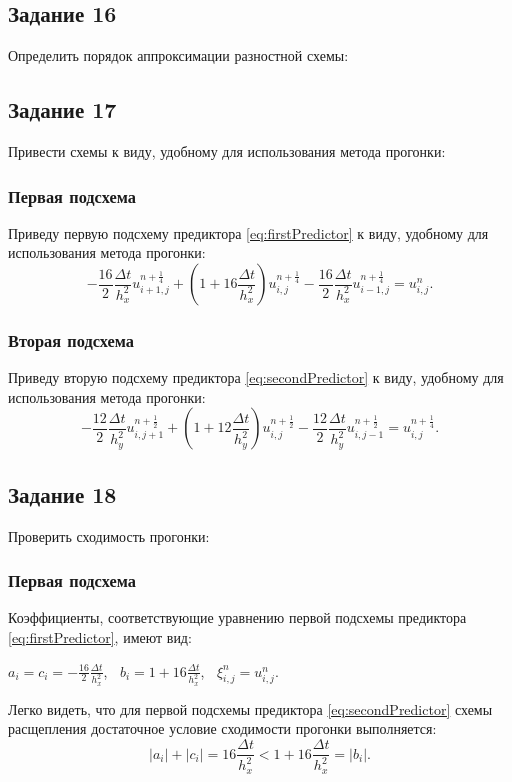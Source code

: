 \documentclass[12pt, a4paper]{report}
\begin{document}
	\subsection*{Задание 16}
	\large
	Определить порядок аппроксимации разностной схемы:

	\subsection*{Задание 17}
	\large
	Привести схемы к виду, удобному для использования метода прогонки:
	\subsubsection*{Первая подсхема}
	\large
	Приведу первую подсхему предиктора \eqref{eq:firstPredictor} к виду, удобному для использования метода прогонки:
	\small
	\begin{equation*}
		-\frac{16}{2}\frac{\Delta t}{h_{x}^{2}}u_{i+1, j}^{n+\frac{1}{4}} + (1 + 16\frac{\Delta t}{h_{x}^{2}})u_{i, j}^{n+\frac{1}{4}} - \frac{16}{2}\frac{\Delta t}{h_{x}^{2}}u_{i-1, j}^{n+\frac{1}{4}} = u_{i, j}^{n}.
	\end{equation*}
	\subsubsection*{Вторая подсхема}
	\large
	Приведу вторую подсхему предиктора \eqref{eq:secondPredictor} к виду, удобному для использования метода прогонки:
	\small
	\begin{equation*}
		-\frac{12}{2}\frac{\Delta t}{h_{y}^{2}}u_{i, j+1}^{n+\frac{1}{2}} + (1 + 12\frac{\Delta t}{h_{y}^{2}})u_{i, j}^{n+\frac{1}{2}} - \frac{12}{2}\frac{\Delta t}{h_{y}^{2}}u_{i, j-1}^{n+\frac{1}{2}} = u_{i, j}^{n+\frac{1}{4}}.
	\end{equation*}

	\subsection*{Задание 18}
	\large
	Проверить сходимость прогонки:
	\subsubsection*{Первая подсхема}
	\large
	Коэффициенты, соответствующие уравнению первой подсхемы предиктора \eqref{eq:firstPredictor}, имеют вид:
	\small
	\begin{center}
		$a_{i}=c_{i}=-\frac{16}{2}\frac{\Delta t}{h_{x}^{2}}$, $\>$ $b_{i}=1 + 16\frac{\Delta t}{h_{x}^{2}}$, $\>$ $\xi_{i, j}^{n}=u_{i, j}^{n}$.
	\end{center}
	\par
	\large
	Легко видеть, что для первой подсхемы предиктора \eqref{eq:secondPredictor} схемы расщепления достаточное условие сходимости прогонки выполняется:
	\begin{equation*}
		\lvert a_{i} \rvert + \lvert c_{i} \rvert = 16\frac{\Delta t}{h_{x}^{2}} < 1 + 16\frac{\Delta t}{h_{x}^{2}} = \lvert b_{i} \rvert.
	\end{equation*}
\end{document}
